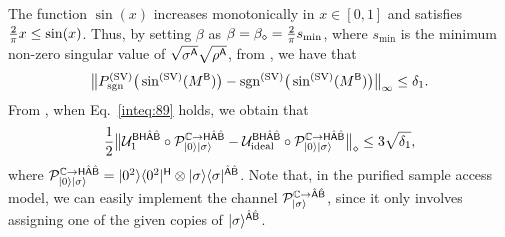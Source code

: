 The function $\sin(x)$ increases monotonically in $x \in [0, 1]$ and satisfies $\frac{2}{\pi} x \leq \sin(x)$.
Thus, by setting $\beta$ as $\beta = \beta_\diamond = \frac{2}{\pi}s_{\rm min}$, where $s_{\min}$ is the minimum non-zero singular value of $\sqrt{\sigma^{\mathsf{A}}}\sqrt{\rho^{\mathsf{A}}}$, from , we have that
\begin{align}
\label{inteq:89}
    \big\|P_{\mathrm{sgn}}^{(\rm SV)}\big(\sin^{(\rm SV)}(M^{\mathsf{B}})\big) - \mathrm{sgn}^{(\rm SV)}\big(\sin^{(\rm SV)}(M^{\mathsf{B}})\big)\big\|_\infty \leq \delta_1.
\end{align}
From , when Eq.~\eqref{inteq:89} holds, we obtain that
\begin{align}
\label{inteq:25}
    \frac{1}{2}\big\|{\mathcal{U}}_1^{{\mathsf{B}}{\mathsf{H}}\hat{{\mathsf{A}}}\hat{{\mathsf{B}}}}\circ{\mathcal{P}}_{|0\rangle|\sigma\rangle}^{\mathbb{C}\rightarrow{\mathsf{H}}\hat{{\mathsf{A}}}\hat{{\mathsf{B}}}} - {\mathcal{U}}_{\rm ideal}^{{\mathsf{B}}{\mathsf{H}}\hat{{\mathsf{A}}}\hat{{\mathsf{B}}}}\circ{\mathcal{P}}_{|0\rangle|\sigma\rangle}^{\mathbb{C}\rightarrow{\mathsf{H}}\hat{{\mathsf{A}}}\hat{{\mathsf{B}}}}\big\|_\diamond \leq 3\sqrt{\delta_1},
\end{align}
where ${\mathcal{P}}_{|0\rangle|\sigma\rangle}^{\mathbb{C}\rightarrow{\mathsf{H}}\hat{{\mathsf{A}}}\hat{{\mathsf{B}}}} = |0^2\rangle\langle0^2|^{\mathsf{H}} \otimes |\sigma\rangle\langle\sigma|^{\hat{{\mathsf{A}}}\hat{{\mathsf{B}}}}$.
Note that, in the purified sample access model, we can easily implement the channel ${\mathcal{P}}_{|\sigma\rangle}^{\mathbb{C}\rightarrow\hat{{\mathsf{A}}}\hat{{\mathsf{B}}}}$, since it only involves assigning one of the given copies of $|\sigma\rangle^{\hat{{\mathsf{A}}}\hat{{\mathsf{B}}}}$.




